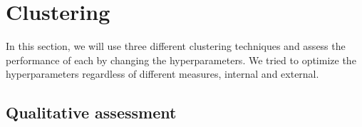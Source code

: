 \section{Clustering}
	In this section, we will use three different clustering techniques and assess the performance of each by changing the hyperparameters. We tried to optimize the hyperparameters regardless of different measures, internal and external. 
	

\subsection{Qualitative assessment}

